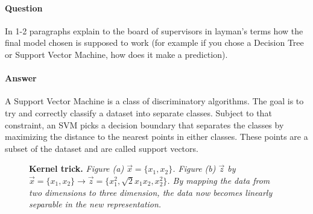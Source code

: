 \documentclass[twoside,openright,titlepage,numbers=noenddot,headinclude,%
               footinclude=true,cleardoublepage=empty,abstractoff,BCOR=5mm,%
               paper=a4,fontsize=11pt,ngerman,american]{scrreprt}
\numberwithin{theorem}{chapter}
\numberwithin{definition}{chapter}
\numberwithin{algorithm}{chapter}
\numberwithin{figure}{chapter}
\numberwithin{table}{chapter}
\numberwithin{equation}{chapter}
\begin{document}
\paragraph{\textbf{Question}} In 1-2 paragraphs explain to the board of supervisors in layman's terms how the final model chosen is supposed to work (for example if you chose a Decision Tree or Support Vector Machine, how does it make a prediction).

\paragraph{\textbf{Answer}} A Support Vector Machine is a class of discriminatory algorithms. The goal is to try and correctly classify a dataset into separate classes. Subject to that constraint, an SVM  picks a decision boundary that separates the classes by maximizing the distance to the nearest points in either classes. These points are a subset of the dataset and are called support vectors. 


\begin{figure}[!hbtp]
\centering
    \caption{\textbf{Kernel trick.} \textit{Figure (a) $\vec{x} = \{x_1,x_2\}$. Figure (b) $\vec{z}$ by $\vec{x} = \{x_1,x_2\} \longrightarrow \vec{z} = \{x_1^2, \sqrt2x_1x_2, x_2^2 \}$. By mapping the data from two dimensions to three dimension, the data now becomes linearly separable in the new representation.}}
\end{figure}
\end{document}
